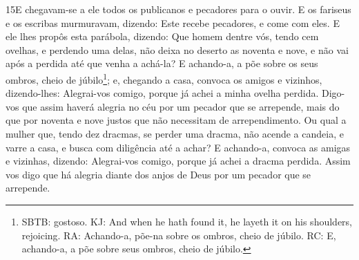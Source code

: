 \lettrine{15} E chegavam-se a ele todos os publicanos e
pecadores para o ouvir. E os fariseus e os escribas murmuravam,
dizendo: Este recebe pecadores, e come com eles. E ele lhes
propôs esta parábola, dizendo: Que homem dentre vós, tendo cem
ovelhas, e perdendo uma delas, não deixa no deserto as noventa e
nove, e não vai após a perdida até que venha a achá-la? E
achando-a, a põe sobre os seus ombros, cheio de
júbilo\footnote{SBTB: gostoso. KJ: And when he hath found it, he
layeth it on his shoulders, rejoicing. RA:  Achando-a, põe-na sobre
os ombros, cheio de júbilo. RC: E, achando-a, a põe sobre seus
ombros, cheio de júbilo.}; e, chegando a casa, convoca os amigos
e vizinhos, dizendo-lhes: Alegrai-vos comigo, porque já achei a
minha ovelha perdida. Digo-vos que assim haverá alegria no céu
por um pecador que se arrepende, mais do que por noventa e nove
justos que não necessitam de arrependimento. Ou qual a mulher
que, tendo dez dracmas, se perder uma dracma, não acende a candeia,
e varre a casa, e busca com diligência até a achar? E achando-a,
convoca as amigas e vizinhas, dizendo: Alegrai-vos comigo, porque já
achei a dracma perdida. Assim vos digo que há alegria diante
dos anjos de Deus por um pecador que se arrepende.

